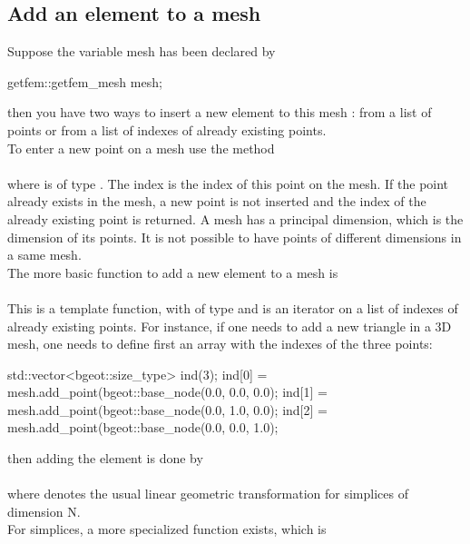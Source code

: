 \documentclass[11pt,a4paper]{article}
\begin{document}
\subsection{Add an element to a mesh}
Suppose the variable mesh has been declared by
\begin{cppcode}
  getfem::getfem\_mesh mesh;
\end{cppcode}
then you have two ways to insert a new element to this mesh : from a list of points or from a list of indexes of already existing points.\\[0.5cm]
To enter a new point on a mesh use the method\\[0.5cm]
\\[0.5cm]
where  is of type . The index  is the index of this point on the mesh. If the point already exists in the mesh, a new point is not inserted and the index of the already existing point is returned. A mesh has a principal dimension, which is the dimension of its points. It is not possible to have points of different dimensions in a same mesh.\\[0.5cm]
The more basic function to add a new element to a mesh is\\[0.5cm]
\\[0.5cm]
This is a template function, with  of type  and  is an iterator on a list of indexes of already existing points. For instance, if one needs to add a new triangle in a 3D mesh, one needs to define first an array with the indexes of the three points:\\[0.5cm]
\begin{cppcode}
  std::vector<bgeot::size\_type> ind(3);
  ind[0] = mesh.add\_point(bgeot::base\_node(0.0, 0.0, 0.0);
  ind[1] = mesh.add\_point(bgeot::base\_node(0.0, 1.0, 0.0);
  ind[2] = mesh.add\_point(bgeot::base\_node(0.0, 0.0, 1.0);
\end{cppcode}
then adding the element is done by\\[0.5cm]
\\[0.5cm]
where  denotes the usual linear geometric transformation for simplices of dimension N.\\[0.5cm]
For simplices, a more specialized function exists, which is\\[0.5cm]
\\[0.5cm]
\end{document}
